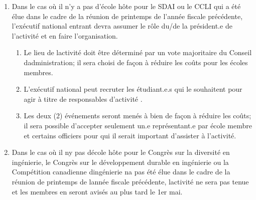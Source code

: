 \begin{enumerate}
 \item
  Dans le cas où il n'y a pas d'école hôte pour le SDAI ou le CCLI qui a été élue dans le cadre de la réunion de printemps de l'année fiscale précédente, l'exécutif national entrant devra assumer le rôle du/de la président.e de l'activité et en faire l'organisation.

  \begin{enumerate}
   \item
    Le lieu de l\textquotesingle activité doit être déterminé par un vote majoritaire du Conseil d\textquotesingle administration; il sera choisi de façon à réduire les coûts pour les écoles membres.
   \item
    L'exécutif national peut recruter les étudiant.e.s qui le souhaitent pour agir à titre de responsables d'activité .
   \item
    Les deux (2) événements seront menés à bien de façon à réduire les coûts; il sera possible d'accepter seulement un.e représentant.e par école membre et certains officiers pour qui il serait important d'assister à l'activité.
  \end{enumerate}
 \item
  Dans le cas où il n\textquotesingle y pas d\textquotesingle école hôte pour le Congrès sur la diversité en ingénierie, le Congrès sur le développement durable en ingénierie ou la Compétition canadienne d\textquotesingle ingénierie n\textquotesingle a pas été élue dans le cadre de la réunion de printemps de l\textquotesingle année fiscale précédente, l\textquotesingle activité ne sera pas tenue et les membres en seront avisés au plus tard le 1er mai.
\end{enumerate}


